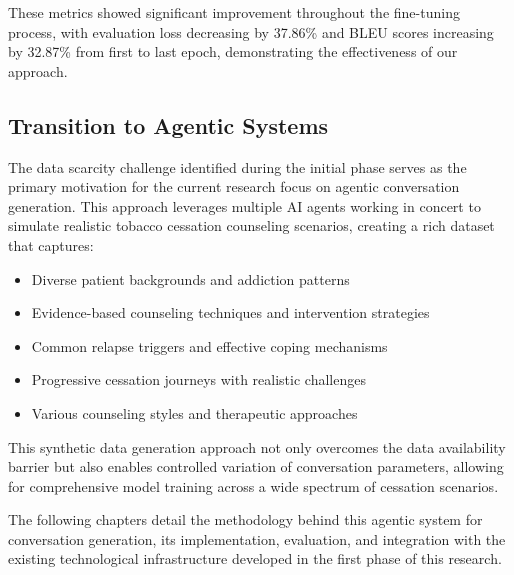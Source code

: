 These metrics showed significant improvement throughout the fine-tuning process, with evaluation loss decreasing by 37.86\% and BLEU scores increasing by 32.87\% from first to last epoch, demonstrating the effectiveness of our approach.

\subsection{Transition to Agentic Systems}

The data scarcity challenge identified during the initial phase serves as the primary motivation for the current research focus on agentic conversation generation. This approach leverages multiple AI agents working in concert to simulate realistic tobacco cessation counseling scenarios, creating a rich dataset that captures:

\begin{itemize}
    \item Diverse patient backgrounds and addiction patterns
    \item Evidence-based counseling techniques and intervention strategies
    \item Common relapse triggers and effective coping mechanisms
    \item Progressive cessation journeys with realistic challenges
    \item Various counseling styles and therapeutic approaches
\end{itemize}

This synthetic data generation approach not only overcomes the data availability barrier but also enables controlled variation of conversation parameters, allowing for comprehensive model training across a wide spectrum of cessation scenarios.

The following chapters detail the methodology behind this agentic system for conversation generation, its implementation, evaluation, and integration with the existing technological infrastructure developed in the first phase of this research.